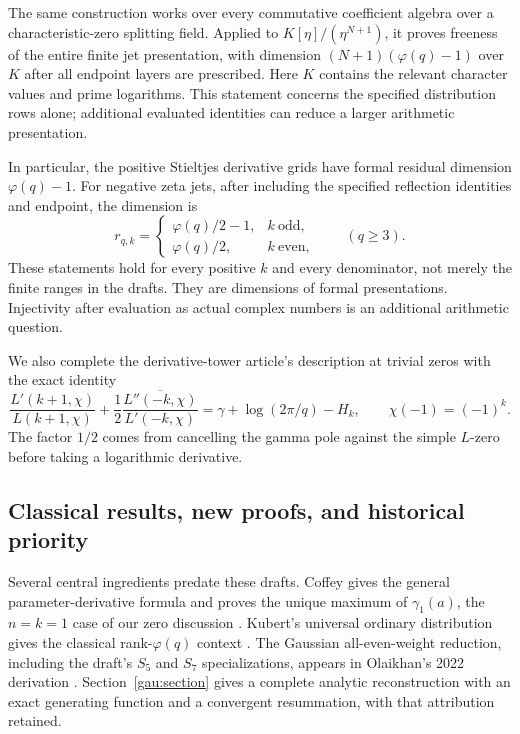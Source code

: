 \documentclass[11pt,a4paper]{article}
\theoremstyle{definition}
\theoremstyle{remark}
\numberwithin{equation}{section}
\begin{document}
The same construction works over every commutative coefficient algebra
over a characteristic-zero splitting field. Applied to
$K[\eta]/(\eta^{N+1})$, it proves freeness of the entire finite jet
presentation, with dimension $(N+1)(\varphi(q)-1)$ over $K$ after all
endpoint layers are prescribed. Here $K$ contains the relevant character
values and prime logarithms. This statement concerns the specified
distribution rows alone; additional evaluated identities can reduce a
larger arithmetic presentation.

In particular, the positive Stieltjes derivative grids have formal
residual dimension $\varphi(q)-1$.  For negative zeta jets, after
including the specified reflection identities and endpoint, the
dimension is
\[
 r_{q,k}=\begin{cases}
 \varphi(q)/2-1,& k\ \text{odd},\\
 \varphi(q)/2,& k\ \text{even},
 \end{cases}\qquad(q\geq3).
\]
These statements hold for every positive $k$ and every denominator,
not merely the finite ranges in the drafts.  They are dimensions of
formal presentations.  Injectivity after evaluation as actual complex
numbers is an additional arithmetic question.

We also complete the derivative-tower article's description at trivial
zeros with the exact identity
\[
 \frac{L'(k+1,\chi)}{L(k+1,\chi)}
 +\frac12\overline{\frac{L''(-k,\chi)}{L'(-k,\chi)}}
 =\gamma+\log(2\pi/q)-H_k,
 \qquad\chi(-1)=(-1)^k.
\]
The factor $1/2$ comes from cancelling the gamma pole against the
simple $L$-zero before taking a logarithmic derivative.

\subsection{Classical results, new proofs, and historical priority}

Several central ingredients predate these drafts.  Coffey gives the
general parameter-derivative formula and proves the unique maximum of
$\gamma_1(a)$, the $n=k=1$ case of our zero discussion
\cite{Coffey2009}.  Kubert's universal ordinary distribution gives the
classical rank-$\varphi(q)$ context \cite{Kubert1979}.  The Gaussian
all-even-weight reduction, including the draft's $S_5$ and $S_7$
specializations, appears in Olaikhan's 2022 derivation
\cite{gau-olaikhan-2022}.  Section~\ref{gau:section} gives a complete
analytic reconstruction with an exact generating function and a
convergent resummation, with that attribution retained.
\end{document}
